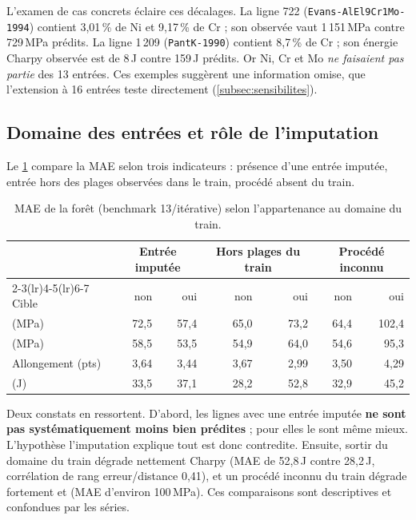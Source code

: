 L'examen de cas concrets éclaire ces décalages. La ligne 722
(\texttt{Evans-AlEl9Cr1Mo-1994}) contient 3,01\,\% de Ni et 9,17\,\% de Cr ; son
\UTS{} observée vaut 1\,151\,MPa contre 729\,MPa prédits. La ligne 1\,209
(\texttt{PantK-1990}) contient 8,7\,\% de Cr ; son énergie Charpy observée est de
8\,J contre 159\,J prédits. Or Ni, Cr et Mo \emph{ne faisaient pas partie} des
13 entrées. Ces exemples suggèrent une information omise, que l'extension à
16 entrées teste directement (\cref{subsec:sensibilites}).

\subsection{Domaine des entrées et rôle de l'imputation}

Le \cref{tab:domaine} compare la MAE selon trois indicateurs : présence d'une
entrée imputée, entrée hors des plages observées dans le train, procédé absent
du train.

\begin{table}[htbp]
\centering
\small
\caption{MAE de la forêt (benchmark 13/itérative) selon l'appartenance au domaine du train.}
\label{tab:domaine}
\begin{tabular}{@{}l rr rr rr@{}}
\toprule
 & \multicolumn{2}{c}{Entrée imputée} & \multicolumn{2}{c}{Hors plages du train} & \multicolumn{2}{c}{Procédé inconnu} \\
\cmidrule(lr){2-3}\cmidrule(lr){4-5}\cmidrule(lr){6-7}
Cible & non & oui & non & oui & non & oui \\
\midrule
\YS{} (MPa)       & 72,5 & 57,4 & 65,0 & 73,2 & 64,4 & 102,4 \\
\UTS{} (MPa)      & 58,5 & 53,5 & 54,9 & 64,0 & 54,6 & 95,3 \\
Allongement (pts) & 3,64 & 3,44 & 3,67 & 2,99 & 3,50 & 4,29 \\
\charpy{} (J)     & 33,5 & 37,1 & 28,2 & 52,8 & 32,9 & 45,2 \\
\bottomrule
\end{tabular}
\end{table}

Deux constats en ressortent. D'abord, les lignes avec une entrée imputée
\textbf{ne sont pas systématiquement moins bien prédites} ; pour \YS{} elles le
sont même mieux. L'hypothèse \og l'imputation explique tout \fg{} est donc
contredite. Ensuite, sortir du domaine du train dégrade nettement Charpy
(MAE de 52,8\,J contre 28,2\,J, corrélation de rang erreur/distance 0,41), et un
procédé inconnu du train dégrade fortement \YS{} et \UTS{} (MAE
d'environ 100\,MPa). Ces comparaisons sont descriptives et confondues par les
séries.

